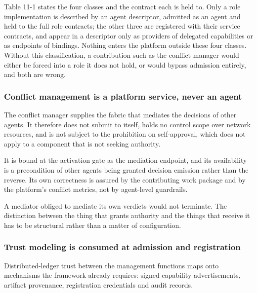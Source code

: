 Table 11-1 states the four classes and the contract each is held to.
Only a role implementation is described by an agent descriptor, admitted
as an agent and held to the full role contracts; the other three are
registered with their service contracts, and appear in a descriptor only
as providers of delegated capabilities or as endpoints of bindings.
Nothing enters the platform outside these four classes. Without this
classification, a contribution such as the conflict manager would either
be forced into a role it does not hold, or would bypass admission
entirely, and both are wrong.

\hypertarget{conflict-management-is-a-platform-service-never-an-agent}{%
\subsubsection{Conflict management is a platform service, never an agent}\label{conflict-management-is-a-platform-service-never-an-agent}}

The conflict manager supplies the fabric that mediates the decisions of
other agents. It therefore does not submit to itself, holds no control
scope over network resources, and is not subject to the prohibition on
self-approval, which does not apply to a component that is not seeking
authority.

It is bound at the activation gate as the mediation endpoint, and its
availability is a precondition of other agents being granted decision
emission rather than the reverse. Its own correctness is assured by the
contributing work package and by the platform's conflict metrics, not by
agent-level guardrails.

A mediator obliged to mediate its own verdicts would not terminate. The
distinction between the thing that grants authority and the things that
receive it has to be structural rather than a matter of configuration.

\hypertarget{trust-modeling-is-consumed-at-admission-and-registration}{%
\subsubsection{Trust modeling is consumed at admission and registration}\label{trust-modeling-is-consumed-at-admission-and-registration}}

Distributed-ledger trust between the management functions maps onto
mechanisms the framework already requires: signed capability
advertisements, artifact provenance, registration credentials and audit
records.

